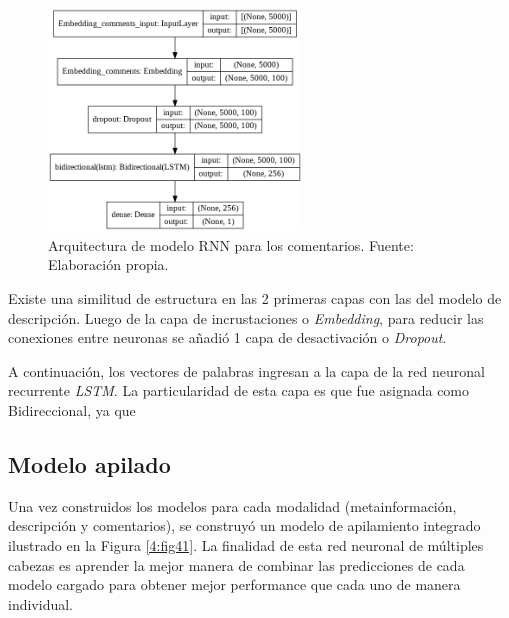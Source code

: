 \begin{figure}[!ht]
	\begin{center}
		\includegraphics[width=0.60\textwidth]{4/figures/model_rnn_comments.png}
		\caption{Arquitectura de modelo RNN para los comentarios. Fuente: Elaboración propia.}
		\label{4:fig40}
	\end{center}
\end{figure}

Existe una similitud de estructura en las 2 primeras capas con las del modelo de descripción. Luego de la capa de incrustaciones o \textit{Embedding}, para reducir las conexiones entre neuronas se añadió 1 capa de desactivación o \textit{Dropout}.

A continuación, los vectores de palabras ingresan a la capa de la red neuronal recurrente \textit{LSTM}. La particularidad de esta capa es que fue asignada como Bidireccional, ya que

\subsection{Modelo apilado}
Una vez construidos los modelos para cada modalidad (metainformación, descripción y comentarios), se construyó un modelo de apilamiento integrado ilustrado en la Figura \ref{4:fig41}. La finalidad de esta red neuronal de múltiples cabezas es aprender la mejor manera de combinar las predicciones de cada modelo cargado para obtener mejor performance que cada uno de manera individual.

